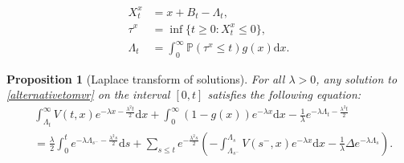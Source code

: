 \documentclass[10pt,a4paper]{amsart}
\newtheorem{proposition}{Proposition}
\begin{document}
\begin{align}
    X^x_t &=x+B_t-\Lambda_t,\nonumber\\
    \tau^x &=\inf\{t\geq 0:X^x_t\leq 0\},\label{alternativetomvr}\\
    \Lambda_t &=\int_0^\infty \mathbb{P}(\tau^x\leq t)g(x)\textrm{d}x.\nonumber
\end{align}

\begin{proposition}[Laplace transform of solutions]
\label{Ito}
For all $\lambda>0$, any solution to \eqref{alternativetomvr} on the interval $[0,t]$ satisfies the following equation:
\begin{align}&\int_{\Lambda_t}^\infty V(t,x)e^{-\lambda x-\frac{\lambda^2t}{2}}\textrm{d}x+\int_0^\infty (1-g(x))e^{-\lambda x}\textrm{d}x-\frac{1}{\lambda}e^{-\lambda \Lambda_t-\frac{\lambda^2t}{2}}\\&=\frac{\lambda}{2}\int_0^te^{-\lambda\Lambda_{s^-}-\frac{\lambda^2s}{2}}\textrm{d}s+\sum_{s\leq t}e^{-\frac{\lambda^2s}{2}}\left(-\int_{\Lambda_{s^-}}^{\Lambda_s} V(s^-,x)e^{-\lambda x}\textrm{d}x-\frac{1}{\lambda}\Delta e^{-\lambda\Lambda_s}\right).\nonumber
\end{align}
\end{proposition}
\end{document}
